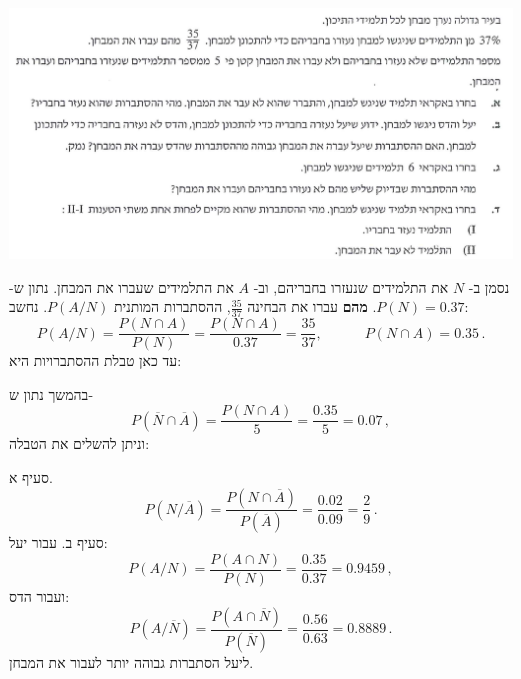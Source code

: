 \documentclass[12pt,a4paper]{article}
\newcommand{\bover}[1]{\bm{\overline{#1}}}
\begin{document}
\begin{center}
\includegraphics[width=	\textwidth]{summer-2018a-3}
\end{center}
נסמן ב-%
$N$
את התלמידים שנעזרו בחבריהם, וב-%
$A$
את התלמידים שעברו את המבחן. נתון ש-%
$P(N)=0.37$.
\textbf{מהם}
עברו את הבחינה 
$\displaystyle\frac{35}{37}$,
ההסתברות המותנית
$P(A/N)$.
נחשב:
\[
P(A/N) = \frac{P(N\cap A)}{P(N)} = \frac{P(N\cap A)}{0.37}=\frac{35}{37},\quad\quad\quad P(N\cap A)=0.35\,.
\]
עד כאן טבלת ההסתברויות היא:
\begin{center}
\end{center}
בהמשך נתון ש-%
\[
P(\overline{N}\cap\overline{A})=\frac{P(N\cap A)}{5}=\frac{0.35}{5}=0.07\,,
\]
וניתן להשלים את הטבלה:
\begin{center}
\end{center}
סעיף א.
\[
P(N/\overline{A})=\frac{P(N\cap \overline{A})}{P(\overline{A})}=\frac{0.02}{0.09}=\frac{2}{9}\,.
\]
סעיף ב. עבור יעל:
\[
P(A/N)=\frac{P(A \cap N)}{P(N)}=\frac{0.35}{0.37}=0.9459\,,
\]
ועבור הדס:
\[
P(A/\overline{N})=\frac{P(A\cap \overline{N})}{P(\overline{N})}=\frac{0.56}{0.63}=0.8889\,.
\]
ליעל הסתברות גבוהה יותר לעבור את המבחן.
\end{document}
